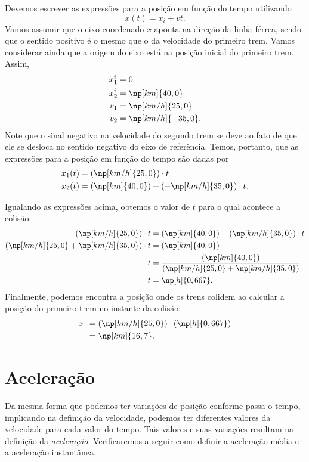 Devemos escrever as expressões para a posição em função do tempo utilizando
\begin{equation}
	x(t) = x_i + vt.
\end{equation}
%
Vamos assumir que o eixo coordenado $x$ aponta na direção da linha férrea, sendo que o sentido positivo é o mesmo que o da velocidade do primeiro trem. Vamos considerar ainda que a origem do eixo está na posição inicial do primeiro trem. Assim,
\begin{align}
	x_1^i &= 0 \\
	x_2^i &= \np[km]{40,0} \\  
	v_1 &= \np[km/h]{25,0} \\
	v_2 &= \np[km/h]{-35,0}.
\end{align}
%
Note que o sinal negativo na velocidade do segundo trem se deve ao fato de que ele se desloca no sentido negativo do eixo de referência. Temos, portanto, que as expressões para a posição em função do tempo são dadas por
\begin{align}
	x_1(t) &= (\np[km/h]{25,0})\cdot t \\
	x_2(t) &= (\np[km]{40,0}) + (-\np[km/h]{35,0})\cdot t.
\end{align}

Igualando as expressões acima, obtemos o valor de $t$ para o qual acontece a colisão:
\begin{align}
	(\np[km/h]{25,0})\cdot t &= (\np[km]{40,0}) - (\np[km/h]{35,0})\cdot t \\
	(\np[km/h]{25,0} + \np[km/h]{35,0})\cdot t &= (\np[km]{40,0}) \\
	t &=\frac{(\np[km]{40,0})}{(\np[km/h]{25,0} + \np[km/h]{35,0})} \\
	t &= \np[h]{0,667}.
\end{align}
%
Finalmente, podemos encontra a posição onde os trens colidem ao calcular a posição do primeiro trem no instante da colisão:
\begin{align}
	x_1 &= (\np[km/h]{25,0})\cdot (\np[h]{0,667}) \\
	&= \np[km]{16,7}.
\end{align}

\section{Aceleração}

Da mesma forma que podemos ter variações de posição conforme passa o tempo, implicando na definição da velocidade, podemos ter diferentes valores da velocidade para cada valor do tempo. Tais valores e suas variações resultam na definição da \emph{aceleração}. Verificaremos a seguir como definir a aceleração média e a aceleração instantânea.

